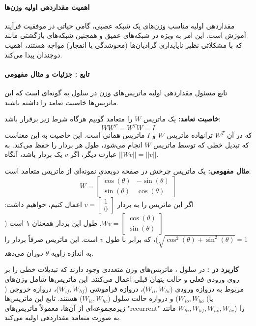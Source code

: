 \documentclass{article}
\begin{document}
\paragraph{اهمیت مقداردهی اولیه وزن‌ها}
مقداردهی اولیه مناسب وزن‌های یک شبکه عصبی، گامی حیاتی در موفقیت فرآیند آموزش است. این امر به ویژه در شبکه‌های عمیق و همچنین شبکه‌های بازگشتی مانند  که با مشکلاتی نظیر ناپایداری گرادیان‌ها (محوشدگی یا انفجار) مواجه هستند، اهمیت دوچندان پیدا می‌کند.

\paragraph{تابع : جزئیات و مثال مفهومی}
تابع  مسئول مقداردهی اولیه ماتریس‌های وزن در سلول  به گونه‌ای است که این ماتریس‌ها خاصیت تعامد را داشته باشند.

\textbf{خاصیت تعامد:}
یک ماتریس \(W\) را متعامد گوییم هرگاه شرط زیر برقرار باشد:
\begin{equation}
	W W^T = W^T W = I
\end{equation}
که در آن \(W^T\) ترانهاده ماتریس \(W\) و \(I\) ماتریس همانی است. این خاصیت به این معناست که تبدیل خطی که توسط ماتریس \(W\) انجام می‌شود، طول هر بردار را حفظ می‌کند. به عبارت دیگر، اگر \(v\) یک بردار باشد، آنگاه \(||Wv|| = ||v||\).

\textbf{مثال مفهومی:}
یک ماتریس چرخش در صفحه دوبعدی نمونه‌ای از ماتریس متعامد است:
\begin{equation}
	W = \begin{bmatrix} \cos(\theta) & -\sin(\theta) \\ \sin(\theta) & \cos(\theta) \end{bmatrix}
\end{equation}
اگر این ماتریس را به بردار \(v = \begin{bmatrix} 1 \\ 0 \end{bmatrix}\) اعمال کنیم، خواهیم داشت:
\(Wv = \begin{bmatrix} \cos(\theta) \\ \sin(\theta) \end{bmatrix}\). طول این بردار همچنان ۱ است (\(\sqrt{\cos^2(\theta) + \sin^2(\theta)} = 1\))، که برابر با طول \(v\) است. این ماتریس صرفاً بردار را به اندازه زاویه \(\theta\) دوران می‌دهد.

\textbf{کاربرد در :}
در سلول ، ماتریس‌های وزن متعددی وجود دارند که تبدیلات خطی را بر روی ورودی فعلی و حالت پنهان قبلی اعمال می‌کنند. این ماتریس‌ها شامل وزن‌های مربوط به دروازه ورودی (\(W_{ii}, W_{hi}\))، دروازه فراموشی (\(W_{if}, W_{hf}\))، دروازه خروجی (\(W_{io}, W_{ho}\)) و دروازه حالت سلول (\(W_{ic}, W_{hc}\)) هستند. تابع  این ماتریس‌ها (یا زیرمجموعه‌ای از آن‌ها، معمولاً ماتریس‌های "recurrent" مانند \(W_{hi}, W_{hf}, W_{ho}, W_{hc}\)) را به صورت متعامد مقداردهی اولیه می‌کند.
\end{document}
